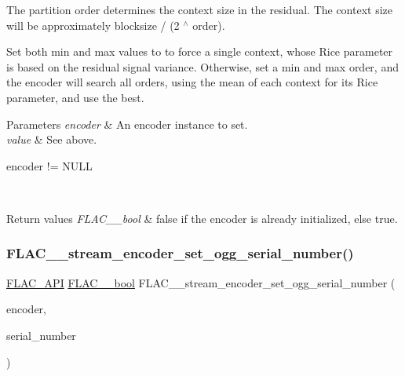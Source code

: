The partition order determines the context size in the residual. The context size will be approximately {\ttfamily blocksize / (2 $^\wedge$ order)}.

Set both min and max values to {} to force a single context, whose Rice parameter is based on the residual signal variance. Otherwise, set a min and max order, and the encoder will search all orders, using the mean of each context for its Rice parameter, and use the best.

{} 
\begin{DoxyParams}{Parameters}
{\em encoder} & An encoder instance to set. \\
\hline
{\em value} & See above.  
\begin{DoxyCode}
encoder != NULL 
\end{DoxyCode}
 \\
\hline
\end{DoxyParams}

\begin{DoxyRetVals}{Return values}
{\em F\+L\+A\+C\+\_\+\+\_\+bool} & {\ttfamily false} if the encoder is already initialized, else {\ttfamily true}. \\
\hline
\end{DoxyRetVals}
\mbox{\label{group__flac__stream__encoder_ga646c9800d42620a6c504fbdfbd092666}} 
\subsubsection{\texorpdfstring{F\+L\+A\+C\+\_\+\+\_\+stream\+\_\+encoder\+\_\+set\+\_\+ogg\+\_\+serial\+\_\+number()}{FLAC\_\_stream\_encoder\_set\_ogg\_serial\_number()}}
{\footnotesize\ttfamily \hyperlink{group__flac__export_ga56ca07df8a23310707732b1c0007d6f5}{F\+L\+A\+C\+\_\+\+A\+PI} \hyperlink{ordinals_8h_a95103469f1cbd78b8cf250194985b34e}{F\+L\+A\+C\+\_\+\+\_\+bool} F\+L\+A\+C\+\_\+\+\_\+stream\+\_\+encoder\+\_\+set\+\_\+ogg\+\_\+serial\+\_\+number (\begin{DoxyParamCaption}\item[{\hyperlink{struct_f_l_a_c_____stream_encoder}{F\+L\+A\+C\+\_\+\+\_\+\+Stream\+Encoder} $\ast$}]{encoder,  }\item[{long}]{serial\+\_\+number }\end{DoxyParamCaption})}

